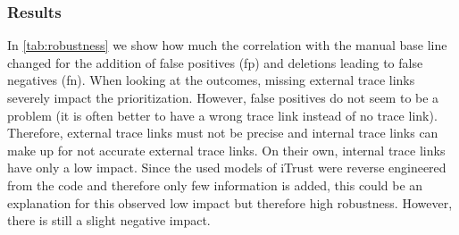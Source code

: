 \subsubsection{Results}
%
	In  \autoref{tab:robustness} we show how much the correlation with the manual base line changed for the addition of false positives (fp) and deletions leading to false negatives (fn).
	When looking at the outcomes, missing external trace links severely impact the prioritization. However, false positives do not seem to be a  problem (it is often better to have a wrong trace link instead of no trace link).
	Therefore, external trace links must not be precise and internal trace links can make up for not accurate external trace links.
	On their own, internal trace links have only a low impact.
	Since the used models of iTrust were reverse engineered from the code and therefore only few information is added, this could be an explanation for this observed low impact but therefore high robustness.
	However, there is still a slight negative impact.

